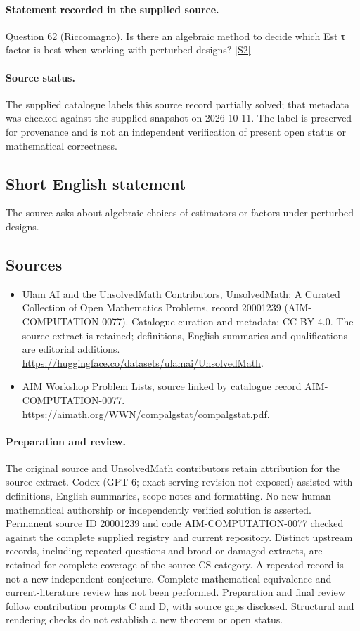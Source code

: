 \documentclass[11pt]{article}
\begin{document}
\paragraph{Statement recorded in the supplied source.}
Question 62 (Riccomagno). Is there an algebraic method to decide which Est τ factor is best when working with perturbed designs? \href{https://aimath.org/WWN/compalgstat/compalgstat.pdf}{[S2]}
\paragraph{Source status.}
The supplied catalogue labels this source record partially solved; that metadata was checked against the supplied snapshot on 2026-10-11. The label is preserved for provenance and is not an independent verification of present open status or mathematical correctness.
\subsection{Short English statement}
The source asks about algebraic choices of estimators or factors under perturbed designs.
\subsection{Sources}
\begin{itemize}
\item[S1] Ulam AI and the UnsolvedMath Contributors, UnsolvedMath: A Curated Collection of Open Mathematics Problems, record 20001239 (AIM-COMPUTATION-0077). Catalogue curation and metadata: CC BY 4.0. The source extract is retained; definitions, English summaries and qualifications are editorial additions.
\url{https://huggingface.co/datasets/ulamai/UnsolvedMath}.
\item[S2] AIM Workshop Problem Lists, source linked by catalogue record AIM-COMPUTATION-0077.
\url{https://aimath.org/WWN/compalgstat/compalgstat.pdf}.
\end{itemize}
\paragraph{Preparation and review.}
The original source and UnsolvedMath contributors retain attribution for the source extract. Codex (GPT-6; exact serving revision not exposed) assisted with definitions, English summaries, scope notes and formatting. No new human mathematical authorship or independently verified solution is asserted. Permanent source ID 20001239 and code AIM-COMPUTATION-0077 checked against the complete supplied registry and current repository. Distinct upstream records, including repeated questions and broad or damaged extracts, are retained for complete coverage of the source CS category. A repeated record is not a new independent conjecture. Complete mathematical-equivalence and current-literature review has not been performed. Preparation and final review follow contribution prompts C and D, with source gaps disclosed. Structural and rendering checks do not establish a new theorem or open status.
\label{end:20001239}
\end{document}
